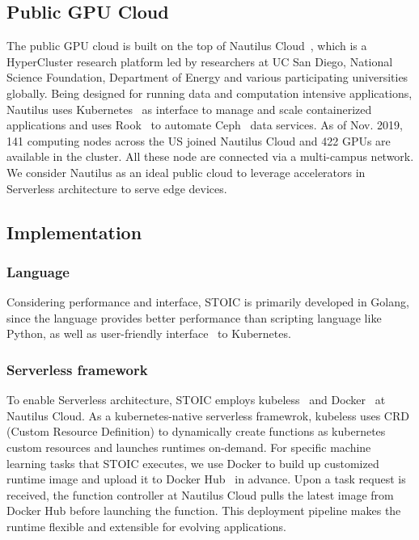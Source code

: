  \subsection{Public GPU Cloud}
 
 The public GPU cloud is built on the top of Nautilus Cloud~\cite{ref:nautilus}, which is a HyperCluster research platform led by researchers at UC San Diego, National Science Foundation, Department of Energy and various participating universities globally. Being designed for running data and computation intensive applications, Nautilus uses Kubernetes~\cite{ref:k8s} as interface to manage and scale containerized applications and uses Rook~\cite{ref:rook} to automate Ceph~\cite{ref:ceph} data services. As of Nov. 2019, 141 computing nodes across the US joined Nautilus Cloud and 422 GPUs are available in the cluster. All these node are connected via a multi-campus network. We consider Nautilus as an ideal public cloud to leverage accelerators in Serverless architecture to serve edge devices. 
 
 \subsection{Implementation}
 
 \subsubsection{Language}
 Considering performance and interface, STOIC is primarily developed in Golang, since the language provides better performance than scripting language like Python, as well as user-friendly interface~\cite{ref:client-go} to Kubernetes. 
 
 \BlankLine
 \subsubsection{Serverless framework}
 To enable Serverless architecture, STOIC employs kubeless~\cite{ref:kubeless} and Docker~\cite{ref:docker} at Nautilus Cloud. As a kubernetes-native serverless framewrok, kubeless uses CRD (Custom Resource Definition)\cite{ref:crd} to dynamically create functions as kubernetes custom resources and launches runtimes on-demand. For specific machine learning tasks that STOIC executes, we use Docker to build up customized runtime image and upload it to Docker Hub~\cite{ref:dockerhub} in advance. Upon a task request is received, the function controller at Nautilus Cloud pulls the latest image from Docker Hub before launching the function. This deployment pipeline makes the runtime flexible and extensible for evolving applications. 
 
